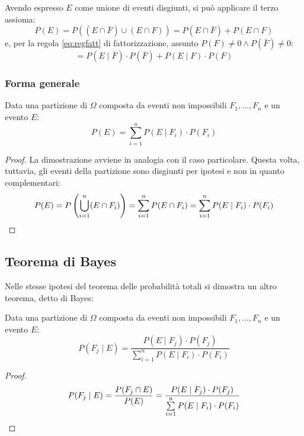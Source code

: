 Avendo espresso $E$ come unione di eventi disgiunti, si può applicare il terzo assioma:
\begin{equation*}
	P(E) = P((E \cap \bar F)\cup(E \cap F)) = P(E \cap \bar F)+P(E \cap F)
\end{equation*}
e, per la regola \eqref{eq:regfatt} di fattorizzazione, assunto $P(F)\neq 0 \land P(\bar F)\neq 0$:
\begin{equation*}
	=P(E\mid \bar F)\cdot P(\bar F) + P(E \mid F)\cdot P(F)
\end{equation*}

\subsubsection{Forma generale}
\begin{teor}
	Data una partizione di $\Omega$ composta da eventi non impossibili $F_1,\dots, F_n$ e un evento $E$:
	\begin{equation*}
		P(E)= \sum_{i=1}^n P(E \mid F_i)\cdot P(F_i)
	\end{equation*}
\end{teor}
\begin{proof}
	La dimostrazione avviene in analogia con il caso particolare. Questa volta, tuttavia, gli eventi della partizione sono disgiunti per ipotesi e non in quanto complementari:
	\begin{equation*}
		P(E)=P \left(\bigcup_{i=1}^n (E\cap F_i) \right) = \sum_{i=1}^n P(E\cap F_i) = \sum_{i=1}^n P(E \mid F_i)\cdot P(F_i) \qedhere
	\end{equation*}
\end{proof}



\subsection{Teorema di Bayes}
Nelle stesse ipotesi del teorema delle probabilità totali si dimostra un altro teorema, detto di Bayes:
\begin{teor}[di Bayes]
	Data una partizione di $\Omega$ composta da eventi non impossibili $F_1,\dots, F_n$ e un evento $E$:
	\begin{equation*}
		P(F_j\mid E)=\frac{P(E\mid F_j)\cdot P(F_j)}{\sum\limits_{i=1}^n P(E \mid F_i)\cdot P(F_i)}
	\end{equation*}
\end{teor}

\begin{proof}
	\begin{equation*}
		P(F_j\mid E)=\frac{P(F_j \cap E)}{P(E)}=\frac{P(E\mid F_j)\cdot P(F_j)}{\sum\limits_{i=1}^n P(E \mid F_i)\cdot P(F_i)} \qedhere
	\end{equation*}
\end{proof}



